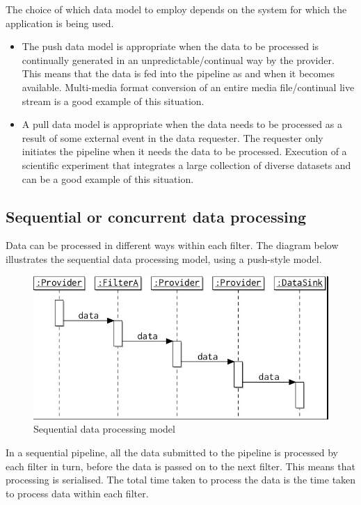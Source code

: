 \documentclass[a4paper, openany]{memoir}
\begin{document}
The choice of which data model to employ depends on the system for which the application is being used. \begin{itemize}
    \item The push data model is appropriate when the data to be processed is continually generated in an unpredictable/continual way by the provider. This means that the data is fed into the pipeline as and when it becomes available. Multi-media format conversion of an entire media file/continual live stream is a good example of this situation.
    \item A pull data model is appropriate when the data needs to be processed as a result of some external event in the data requester. The requester only initiates the pipeline when it needs the data to be processed. Execution of a scientific experiment that integrates a large collection of diverse datasets and can be a good example of this situation.
\end{itemize}

\subsection{Sequential or concurrent data processing}
Data can be processed in different ways within each filter. The diagram below illustrates the sequential data processing model, using a push-style model.
\begin{figure}[H]
    \centering
    \includegraphics[scale=0.45]{src/14.15 sequential.png}
    \caption{Sequential data processing model}
\end{figure}
\noindent In a sequential pipeline, all the data submitted to the pipeline is processed by each filter in turn, before the data is passed on to the next filter. This means that processing is serialised. The total time taken to process the data is the time taken to process data within each filter.
\end{document}
